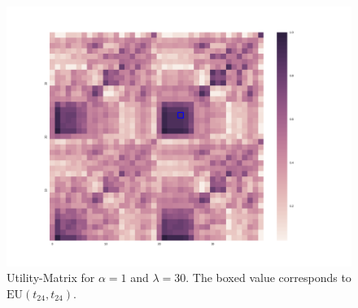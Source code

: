 \documentclass[a4paper]{article}
\begin{document}
\begin{figure}[h!]
  \centering
  \includegraphics[scale=.25]{../code-LOT-extension/plots/u-l30-a1-meTrue.png} %
  \caption{Utility-Matrix for $\alpha = 1$ and $\lambda = 30$. The boxed value corresponds to $\text{EU}(t_{24},t_{24})$.}
  \label{fig:u-matrix}
\end{figure}
\end{document}
